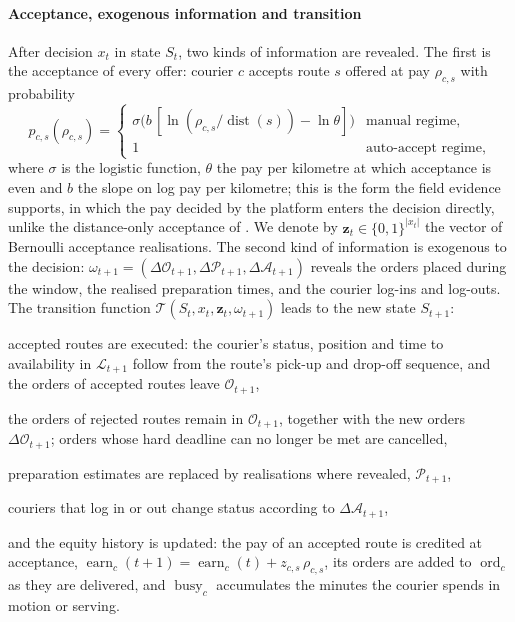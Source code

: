 \documentclass[a4paper,11pt,review,3p,authoryear]{elsarticle}
\DeclareMathOperator{\dist}{dist}
\DeclareMathOperator{\earn}{earn}
\DeclareMathOperator{\busy}{busy}
\DeclareMathOperator{\ord}{ord}
\begin{document}
\paragraph{Acceptance, exogenous information and transition}

After decision $x_t$ in state $S_t$, two kinds of information are revealed. The first is the acceptance of every offer: courier $c$ accepts route $s$ offered at pay $\rho_{c,s}$ with probability
\begin{equation}
p_{c,s}(\rho_{c,s}) =
\begin{cases}
\sigma\!\bigl(b\,[\ln(\rho_{c,s}/\dist(s)) - \ln\theta]\bigr) & \text{manual regime},\\[2pt]
1 & \text{auto-accept regime},
\end{cases}
\label{eqn:acceptance}
\end{equation}
where $\sigma$ is the logistic function, $\theta$ the pay per kilometre at which acceptance is even and $b$ the slope on log pay per kilometre; this is the form the field evidence supports, in which the pay decided by the platform enters the decision directly, unlike the distance-only acceptance of \cite{quintero2020computational}. We denote by $\mathbf{z}_t \in \{0,1\}^{|x_t|}$ the vector of Bernoulli acceptance realisations. The second kind of information is exogenous to the decision: $\omega_{t+1} = (\Delta\mathcal{O}_{t+1}, \Delta\mathcal{P}_{t+1}, \Delta\mathcal{A}_{t+1})$ reveals the orders placed during the window, the realised preparation times, and the courier log-ins and log-outs. The transition function $\mathcal{T}(S_t, x_t, \mathbf{z}_t, \omega_{t+1})$ leads to the new state $S_{t+1}$:

\begin{compactitem}
    \item accepted routes are executed: the courier's status, position and time to availability in $\mathcal{L}_{t+1}$ follow from the route's pick-up and drop-off sequence, and the orders of accepted routes leave $\mathcal{O}_{t+1}$,
    \item the orders of rejected routes remain in $\mathcal{O}_{t+1}$, together with the new orders $\Delta\mathcal{O}_{t+1}$; orders whose hard deadline can no longer be met are cancelled,
    \item preparation estimates are replaced by realisations where revealed, $\mathcal{P}_{t+1}$,
    \item couriers that log in or out change status according to $\Delta\mathcal{A}_{t+1}$,
    \item and the equity history is updated: the pay of an accepted route is credited at acceptance, $\earn_c(t+1) = \earn_c(t) + z_{c,s}\, \rho_{c,s}$, its orders are added to $\ord_c$ as they are delivered, and $\busy_c$ accumulates the minutes the courier spends in motion or serving.
\end{compactitem}
\end{document}
